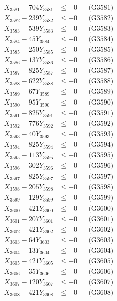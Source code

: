 \documentclass[a4paper,10pt]{article}
\begin{document}
{\begin{align}
\allowbreak
X_{3581} - 704Y_{3581} &\leq +0 && \text{(G3581)} \\
X_{3582} - 239Y_{3582} &\leq +0 && \text{(G3582)} \\
X_{3583} - 539Y_{3583} &\leq +0 && \text{(G3583)} \\
X_{3584} - 45Y_{3584} &\leq +0 && \text{(G3584)} \\
X_{3585} - 250Y_{3585} &\leq +0 && \text{(G3585)} \\
X_{3586} - 137Y_{3586} &\leq +0 && \text{(G3586)} \\
X_{3587} - 825Y_{3587} &\leq +0 && \text{(G3587)} \\
X_{3588} - 622Y_{3588} &\leq +0 && \text{(G3588)} \\
X_{3589} - 67Y_{3589} &\leq +0 && \text{(G3589)} \\
X_{3590} - 95Y_{3590} &\leq +0 && \text{(G3590)} \\
\allowbreak
X_{3591} - 825Y_{3591} &\leq +0 && \text{(G3591)} \\
X_{3592} - 776Y_{3592} &\leq +0 && \text{(G3592)} \\
X_{3593} - 40Y_{3593} &\leq +0 && \text{(G3593)} \\
X_{3594} - 825Y_{3594} &\leq +0 && \text{(G3594)} \\
X_{3595} - 113Y_{3595} &\leq +0 && \text{(G3595)} \\
X_{3596} - 302Y_{3596} &\leq +0 && \text{(G3596)} \\
X_{3597} - 825Y_{3597} &\leq +0 && \text{(G3597)} \\
X_{3598} - 205Y_{3598} &\leq +0 && \text{(G3598)} \\
X_{3599} - 129Y_{3599} &\leq +0 && \text{(G3599)} \\
X_{3600} - 421Y_{3600} &\leq +0 && \text{(G3600)} \\
\allowbreak
X_{3601} - 207Y_{3601} &\leq +0 && \text{(G3601)} \\
X_{3602} - 421Y_{3602} &\leq +0 && \text{(G3602)} \\
X_{3603} - 64Y_{3603} &\leq +0 && \text{(G3603)} \\
X_{3604} - 13Y_{3604} &\leq +0 && \text{(G3604)} \\
X_{3605} - 421Y_{3605} &\leq +0 && \text{(G3605)} \\
X_{3606} - 35Y_{3606} &\leq +0 && \text{(G3606)} \\
X_{3607} - 120Y_{3607} &\leq +0 && \text{(G3607)} \\
X_{3608} - 421Y_{3608} &\leq +0 && \text{(G3608)} \\

\end{align}}
\end{document}
